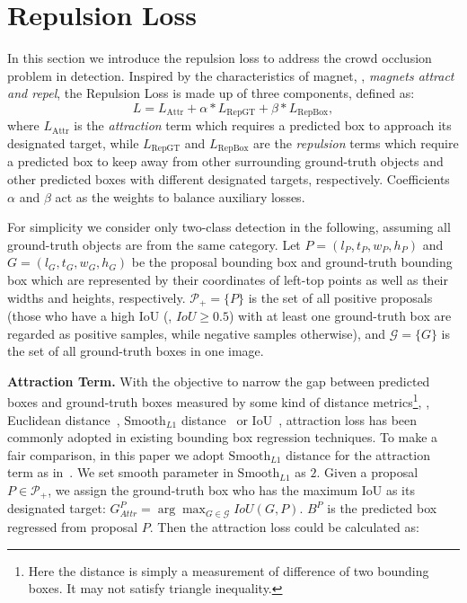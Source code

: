 \documentclass[10pt,twocolumn,letterpaper]{article}
\newcommand{\myparagraph}[1]{{\vspace{0.5em} \noindent \bf #1}}
\begin{document}
\section{Repulsion Loss}
\label{sec:approach}


In this section we introduce the repulsion loss to address the crowd occlusion problem in detection. Inspired by the characteristics of magnet, \ie, {\it magnets attract and repel}, the Repulsion Loss is made up of three components, defined as:
\begin{equation}
L=L_\mathrm{Attr} + \alpha * L_\mathrm{RepGT} + \beta * L_\mathrm{RepBox},
\end{equation}
where $L_\mathrm{Attr}$ is the {\it attraction} term which requires a predicted box to approach its designated target, while $L_\mathrm{RepGT}$ and $L_\mathrm{RepBox}$ are the {\it repulsion} terms which require a predicted box to keep away from other surrounding ground-truth objects and other predicted boxes with different designated targets, respectively. Coefficients $\alpha$ and $\beta$ act as the weights to balance auxiliary losses.

For simplicity we consider only two-class detection in the following, assuming all ground-truth objects are from the same category. Let $P =(l_P, t_P, w_P, h_P)$ and $G =(l_G, t_G, w_G, h_G)$ be the proposal bounding box and ground-truth bounding box which are represented by their coordinates of left-top points as well as their widths and heights, respectively. $\mathcal{P_+} = \{P\}$ is the set of all positive proposals (those who have a high IoU (\eg, $IoU \geq 0.5$) with at least one ground-truth box are regarded as positive samples, while negative samples otherwise), and $\mathcal{G} = \{G\}$ is the set of all ground-truth boxes in one image.

\myparagraph{Attraction Term.} With the objective to narrow the gap between predicted boxes and ground-truth boxes measured by some kind of distance metrics\footnote{Here the distance is simply a measurement of difference of two bounding boxes. It may not satisfy triangle inequality.}, \eg, Euclidean distance~\cite{Girshick_2014_CVPR}, $\mathrm{Smooth}_{L1}$ distance~\cite{Girshick_2015_ICCV} or IoU~\cite{yu2016unitbox}, attraction loss has been commonly adopted in existing bounding box regression techniques. To make a fair comparison, in this paper we adopt $\mathrm{Smooth}_{L1}$ distance for the attraction term as in~\cite{mao2017can,zhang2017citypersons}. We set smooth parameter in $\mathrm{Smooth}_{L1}$ as $2$. Given a proposal $P \in \mathcal{P_+}$, we assign the ground-truth box who has the maximum IoU as its designated target: $G_{Attr}^P = \arg\max_{G \in \mathcal{G}} IoU(G, P)$. $B^P$ is the predicted box regressed from proposal $P$. Then the attraction loss could be calculated as:
\end{document}
